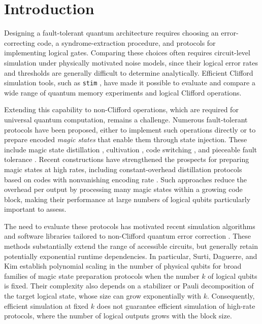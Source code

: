 \section{Introduction}

Designing a fault-tolerant quantum architecture requires choosing an error-correcting code, a syndrome-extraction procedure, and protocols for implementing logical gates. Comparing these choices often requires circuit-level simulation under physically motivated noise models, since their logical error rates and thresholds are generally difficult to determine analytically. Efficient Clifford simulation tools, such as \texttt{stim} \cite{gidney2021stim}, have made it possible to evaluate and compare a wide range of quantum memory experiments and logical Clifford operations.

Extending this capability to non-Clifford operations, which are required for universal quantum computation, remains a challenge. Numerous fault-tolerant protocols have been proposed, either to implement such operations directly or to prepare encoded \emph{magic states} that enable them through state injection. These include magic state distillation \cite{bravyi2005universal,bravyi2012magic,campbell2017unified,litinski2019magic}, cultivation \cite{gidney2024magic,vaknin2026high}, code switching \cite{beverland2021cost,bombin2014gauge,kubica2015universal,tan2025singleshot}, and pieceable fault tolerance \cite{yoder2016universal}. Recent constructions have strengthened the prospects for preparing magic states at high rates, including constant-overhead distillation protocols based on codes with nonvanishing encoding rate \cite{golowich2024asymptotically, golowich2024quantum, he2025asymptotically, li2026transversal, nguyen2024good, scruby2025quantum, steinberg2025universal, tan2025singleshot, wills2024constantoverhead, wills2026improved, xu2025batched, zhu2025nonclifford}. Such approaches reduce the overhead per output by processing many magic states within a growing code block, making their performance at large numbers of logical qubits particularly important to assess.

The need to evaluate these protocols has motivated recent simulation algorithms and software libraries tailored to non-Clifford quantum error correction \cite{haenel2026tsim,chase2026clifft,umbrarescu2026syqma,fang2026symft,surti2026efficient}. These methods substantially extend the range of accessible circuits, but generally retain potentially exponential runtime dependencies. In particular, Surti, Daguerre, and Kim \cite{surti2026efficient} establish polynomial scaling in the number of physical qubits for broad families of magic state preparation protocols when the number $k$ of logical qubits is fixed. Their complexity also depends on a stabilizer or Pauli decomposition of the target logical state, whose size can grow exponentially with $k$. Consequently, efficient simulation at fixed $k$ does not guarantee efficient simulation of high-rate protocols, where the number of logical outputs grows with the block size.

